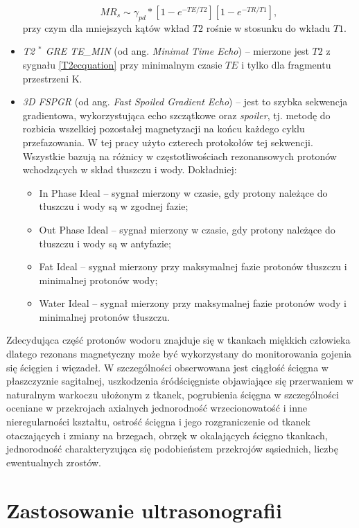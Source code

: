 \begin{itemize}
	\begin{equation}
	MR_s \sim \gamma_{pd} \ast [1-e^{-TE/T2}][1-e^{-TR/T1}],
	\end{equation}
	przy czym dla mniejszych kątów wkład $T2$ rośnie w stosunku do wkładu $T1$.
	\item \textit{T2 $^\ast$ GRE TE\_MIN} (od ang. \textit{Minimal Time Echo}) -- mierzone jest $T2$ z sygnału \ref{T2ecquation} przy minimalnym czasie $TE$ i tylko dla fragmentu przestrzeni K. 
	\item \textit{3D FSPGR} (od ang. \textit{Fast Spoiled Gradient Echo}) -- jest to szybka sekwencja gradientowa, wykorzystująca echo szczątkowe oraz \textit{spoiler}, tj. metodę do rozbicia wszelkiej pozostałej magnetyzacji na końcu każdego cyklu przefazowania. W tej pracy użyto czterech protokołów tej sekwencji. Wszystkie bazują na różnicy w częstotliwościach rezonansowych protonów wchodzących w skład tłuszczu i wody. Dokładniej:
	\begin{itemize}
		\item In Phase Ideal -- sygnał mierzony w czasie, gdy protony należące do tłuszczu i wody są w zgodnej fazie;
		\item Out Phase Ideal -- sygnał mierzony w czasie, gdy protony należące do tłuszczu i wody są w antyfazie;
		\item Fat Ideal -- sygnał mierzony przy maksymalnej fazie protonów tłuszczu i minimalnej protonów wody;
		\item Water Ideal -- sygnał mierzony przy maksymalnej fazie protonów wody i minimalnej protonów tłuszczu.
	\end{itemize}
\end{itemize}

Zdecydująca część protonów wodoru znajduje się w tkankach miękkich człowieka dlatego rezonans magnetyczny może być wykorzystany do monitorowania gojenia się ścięgien i więzadeł. W szczególności obserwowana jest ciągłość ścięgna w płaszczyznie sagitalnej, uszkodzenia śródścięgniste objawiające się przerwaniem w naturalnym warkoczu ułożonym z tkanek, pogrubienia ścięgna w szczególności oceniane w przekrojach axialnych jednorodność wrzecionowatość i inne nieregularności kształtu, ostrość ścięgna i jego rozgraniczenie od tkanek otaczających i zmiany na brzegach, obrzęk w okalających ścięgno tkankach, jednorodność charakteryzująca się podobieństem przekrojów sąsiednich, liczbę ewentualnych zrostów.

\section{Zastosowanie ultrasonografii}

